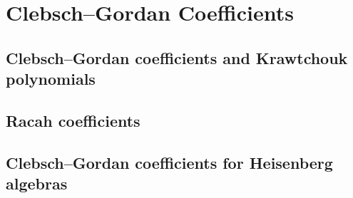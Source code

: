 \chapter{Clebsch--Gordan Coefficients}
\label{ch:12}
\section{Clebsch--Gordan coefficients and Krawtchouk polynomials}
\label{sec:12-1}

\section{Racah coefficients}
\label{sec:12-2}

\section{Clebsch--Gordan coefficients for Heisenberg algebras}
\label{sec:12-3}

